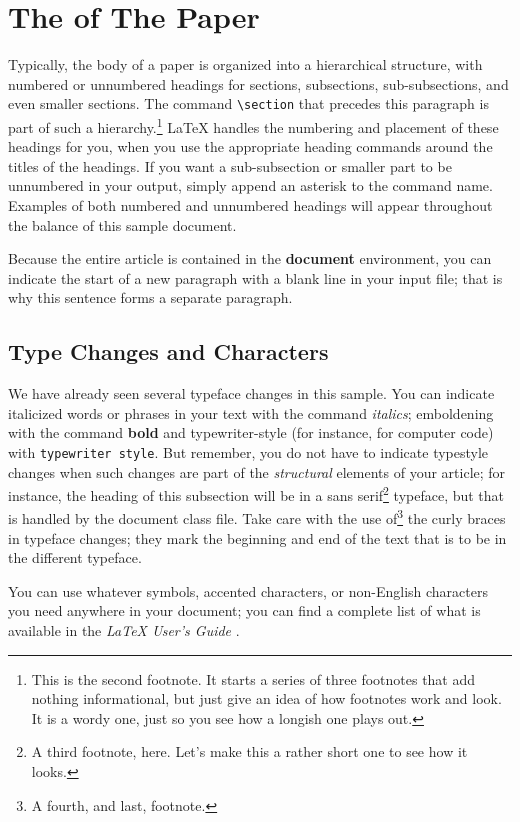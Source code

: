 \documentclass{acm_proc_article-sp}
\begin{document}
\section{The {} of The Paper}
\label{sec-3}


Typically, the body of a paper is organized into a hierarchical
structure, with numbered or unnumbered headings for sections,
subsections, sub-subsections, and even smaller sections.  The command
\texttt{\textbackslash{}section} that precedes this paragraph is part of such a
hierarchy.\footnote{This is the second footnote.  It
starts a series of three footnotes that add nothing
informational, but just give an idea of how footnotes work
and look. It is a wordy one, just so you see
how a longish one plays out.
 } \LaTeX{} handles the numbering and placement of these
headings for you, when you use the appropriate heading commands around
the titles of the headings.  If you want a sub-subsection or smaller
part to be unnumbered in your output, simply append an asterisk to the
command name.  Examples of both numbered and unnumbered headings will
appear throughout the balance of this sample document.

Because the entire article is contained in the \textbf{document} environment,
you can indicate the start of a new paragraph with a blank line in
your input file; that is why this sentence forms a separate paragraph.
\subsection{Type Changes and {} Characters}
\label{sec-3-1}


We have already seen several typeface changes in this sample.  You can
indicate italicized words or phrases in your text with the command
\emph{italics}; emboldening with the command \textbf{bold} and typewriter-style
(for instance, for computer code) with \texttt{typewriter style}.  But
remember, you do not have to indicate typestyle changes when such
changes are part of the \emph{structural} elements of your article; for
instance, the heading of this subsection will be in a sans serif\footnote{A third footnote, here.  Let's make this a rather short
one to see how it looks.
 }
typeface, but that is handled by the document class file. Take care
with the use of\footnote{A fourth, and
last, footnote.
 } the curly braces in typeface changes; they mark
the beginning and end of the text that is to be in the different
typeface.

You can use whatever symbols, accented characters, or non-English
characters you need anywhere in your document; you can find a complete
list of what is available in the \emph{\LaTeX{} User's Guide} \cite{Lamport:LaTeX}.
\end{document}
